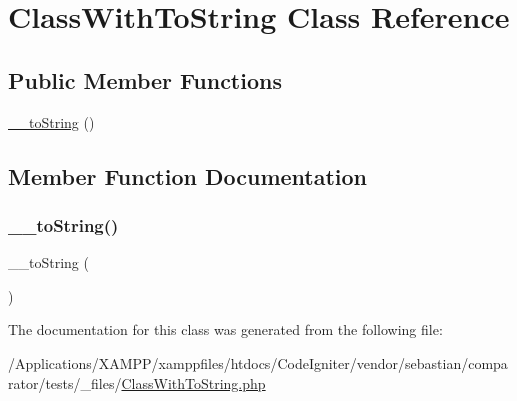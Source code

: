\hypertarget{class_sebastian_bergmann_1_1_comparator_1_1_class_with_to_string}{}\section{Class\+With\+To\+String Class Reference}
\label{class_sebastian_bergmann_1_1_comparator_1_1_class_with_to_string}
\subsection*{Public Member Functions}
\begin{DoxyCompactItemize}
\item 
\mbox{\hyperlink{class_sebastian_bergmann_1_1_comparator_1_1_class_with_to_string_a7516ca30af0db3cdbf9a7739b48ce91d}{\+\_\+\+\_\+to\+String}} ()
\end{DoxyCompactItemize}


\subsection{Member Function Documentation}
\mbox{\label{class_sebastian_bergmann_1_1_comparator_1_1_class_with_to_string_a7516ca30af0db3cdbf9a7739b48ce91d}} 
\subsubsection{\texorpdfstring{\+\_\+\+\_\+to\+String()}{\_\_toString()}}
{\footnotesize\ttfamily \+\_\+\+\_\+to\+String (\begin{DoxyParamCaption}{ }\end{DoxyParamCaption})}



The documentation for this class was generated from the following file\+:\begin{DoxyCompactItemize}
\item 
/\+Applications/\+X\+A\+M\+P\+P/xamppfiles/htdocs/\+Code\+Igniter/vendor/sebastian/comparator/tests/\+\_\+files/\mbox{\hyperlink{sebastian_2comparator_2tests_2__files_2_class_with_to_string_8php}{Class\+With\+To\+String.\+php}}\end{DoxyCompactItemize}

